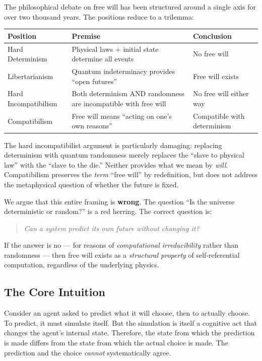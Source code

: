 \documentclass[12pt,a4paper]{article}
\theoremstyle{definition}
\theoremstyle{remark}
\begin{document}
The philosophical debate on free will has been structured around a single
axis for over two thousand years. The positions reduce to a trilemma:

\begin{center}
\begin{tabular}{p{3.2cm} p{5cm} p{5cm}}
\toprule
\textbf{Position} & \textbf{Premise} & \textbf{Conclusion} \\
\midrule
Hard Determinism & Physical laws $+$ initial state determine all events & No free will \\
Libertarianism & Quantum indeterminacy provides ``open futures'' & Free will exists \\
Hard Incompatibilism & Both determinism AND randomness are incompatible with free will & No free will either way \\
Compatibilism & Free will means ``acting on one's own reasons'' & Compatible with determinism \\
\bottomrule
\end{tabular}
\end{center}

The hard incompatibilist argument \cite{strawson1994, pereboom2001} is
particularly damaging: replacing determinism with quantum randomness merely
replaces the ``slave to physical law'' with the ``slave to the die.'' Neither
provides what we mean by \emph{will}. Compatibilism \cite{dennett1984}
preserves the \emph{term} ``free will'' by redefinition, but does not address
the metaphysical question of whether the future is fixed.

We argue that this entire framing is \textbf{wrong}. The question ``Is the
universe deterministic or random?'' is a red herring. The correct question is:

\begin{quote}
\textit{Can a system predict its own future without changing it?}
\end{quote}

If the answer is no --- for reasons of \emph{computational irreducibility}
rather than randomness --- then free will exists as a \emph{structural property}
of self-referential computation, regardless of the underlying physics.

\subsection{The Core Intuition}

Consider an agent asked to predict what it will choose, then to actually
choose. To predict, it must simulate itself. But the simulation is itself a
cognitive act that changes the agent's internal state. Therefore, the state
from which the prediction is made differs from the state from which the actual
choice is made. The prediction and the choice \emph{cannot} systematically
agree.
\end{document}
